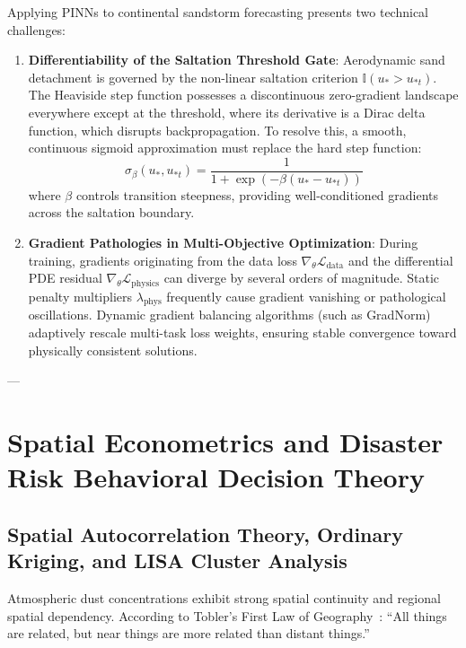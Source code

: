 Applying PINNs to continental sandstorm forecasting presents two technical challenges:
\begin{enumerate}
    \item \textbf{Differentiability of the Saltation Threshold Gate}: Aerodynamic sand detachment is governed by the non-linear saltation criterion $\mathbb{I}(u_* > u_{*t})$. The Heaviside step function possesses a discontinuous zero-gradient landscape everywhere except at the threshold, where its derivative is a Dirac delta function, which disrupts backpropagation. To resolve this, a smooth, continuous sigmoid approximation must replace the hard step function:
    \begin{equation}
    \sigma_\beta(u_*, u_{*t}) = \frac{1}{1 + \exp\left(-\beta (u_* - u_{*t})\right)}
    \end{equation}
    where $\beta$ controls transition steepness, providing well-conditioned gradients across the saltation boundary.
    \item \textbf{Gradient Pathologies in Multi-Objective Optimization}: During training, gradients originating from the data loss $\nabla_\theta \mathcal{L}_{\text{data}}$ and the differential PDE residual $\nabla_\theta \mathcal{L}_{\text{physics}}$ can diverge by several orders of magnitude. Static penalty multipliers $\lambda_{\text{phys}}$ frequently cause gradient vanishing or pathological oscillations. Dynamic gradient balancing algorithms (such as GradNorm) adaptively rescale multi-task loss weights, ensuring stable convergence toward physically consistent solutions.
\end{enumerate}

---

\section{Spatial Econometrics and Disaster Risk Behavioral Decision Theory}
\label{sec:spatial_behavioral}

\subsection{Spatial Autocorrelation Theory, Ordinary Kriging, and LISA Cluster Analysis}
\label{subsec:spatial_autocorrelation}

Atmospheric dust concentrations exhibit strong spatial continuity and regional spatial dependency. According to Tobler's First Law of Geography~\cite{tobler1970cellular}: ``All things are related, but near things are more related than distant things.''

